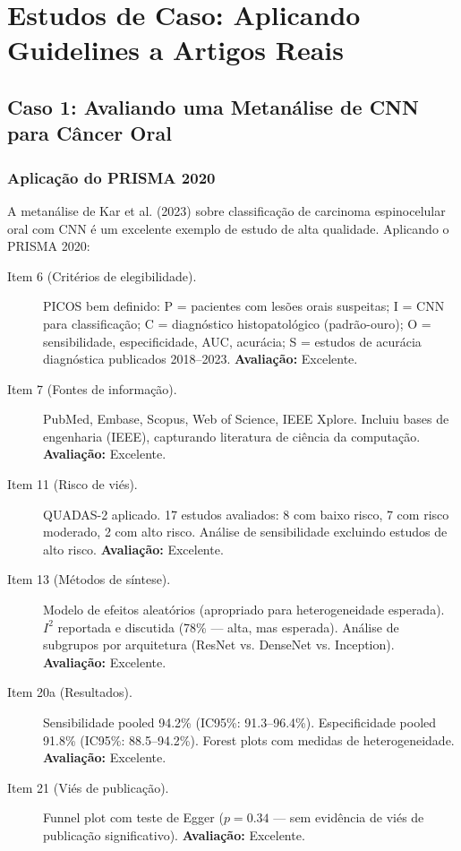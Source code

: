 \section{Estudos de Caso: Aplicando Guidelines a Artigos Reais}

\subsection{Caso 1: Avaliando uma Metanálise de CNN para Câncer Oral}

\subsubsection{Aplicação do PRISMA 2020}

A metanálise de Kar et al. (2023) \cite{ODT-010} sobre classificação de carcinoma espinocelular oral com CNN é um excelente exemplo de estudo de alta qualidade. Aplicando o PRISMA 2020:

\begin{description}
    \item[Item 6 (Critérios de elegibilidade).] PICOS bem definido: P = pacientes com lesões orais suspeitas; I = CNN para classificação; C = diagnóstico histopatológico (padrão-ouro); O = sensibilidade, especificidade, AUC, acurácia; S = estudos de acurácia diagnóstica publicados 2018--2023. \textbf{Avaliação:} Excelente.
    \item[Item 7 (Fontes de informação).] PubMed, Embase, Scopus, Web of Science, IEEE Xplore. Incluiu bases de engenharia (IEEE), capturando literatura de ciência da computação. \textbf{Avaliação:} Excelente.
    \item[Item 11 (Risco de viés).] QUADAS-2 aplicado. 17 estudos avaliados: 8 com baixo risco, 7 com risco moderado, 2 com alto risco. Análise de sensibilidade excluindo estudos de alto risco. \textbf{Avaliação:} Excelente.
    \item[Item 13 (Métodos de síntese).] Modelo de efeitos aleatórios (apropriado para heterogeneidade esperada). $I^2$ reportada e discutida (78\% — alta, mas esperada). Análise de subgrupos por arquitetura (ResNet vs. DenseNet vs. Inception). \textbf{Avaliação:} Excelente.
    \item[Item 20a (Resultados).] Sensibilidade pooled 94.2\% (IC95\%: 91.3--96.4\%). Especificidade pooled 91.8\% (IC95\%: 88.5--94.2\%). Forest plots com medidas de heterogeneidade. \textbf{Avaliação:} Excelente.
    \item[Item 21 (Viés de publicação).] Funnel plot com teste de Egger ($p = 0.34$ — sem evidência de viés de publicação significativo). \textbf{Avaliação:} Excelente.
\end{description}

